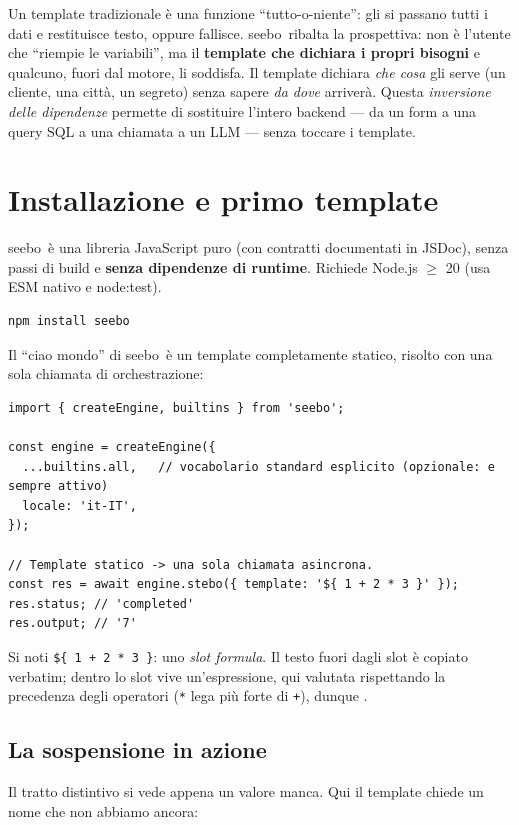 \documentclass[11pt,a4paper]{book}
\let\code\lstinline
\newcommand{\ic}[1]{{\ttfamily #1}}
\theoremstyle{definition}
\newcommand{\seebo}{\textsf{seebo}}
\begin{document}
Un template tradizionale è una funzione ``tutto-o-niente'': gli si passano tutti
i dati e restituisce testo, oppure fallisce. \seebo\ ribalta la prospettiva: non
è l'utente che ``riempie le variabili'', ma il \textbf{template che dichiara i
propri bisogni} e qualcuno, fuori dal motore, li soddisfa. Il template dichiara
\emph{che cosa} gli serve (un cliente, una città, un segreto) senza sapere
\emph{da dove} arriverà. Questa \emph{inversione delle dipendenze} permette di
sostituire l'intero backend --- da un form a una query SQL a una chiamata a un
LLM --- senza toccare i template.

\section{Installazione e primo template}

\seebo\ è una libreria JavaScript puro (con contratti documentati in JSDoc),
senza passi di build e \textbf{senza dipendenze di runtime}. Richiede Node.js
$\geq$ 20 (usa ESM nativo e \ic{node:test}).

\begin{lstlisting}
npm install seebo
\end{lstlisting}

Il ``ciao mondo'' di \seebo\ è un template completamente statico, risolto con una
sola chiamata di orchestrazione:

\begin{lstlisting}
import { createEngine, builtins } from 'seebo';

const engine = createEngine({
  ...builtins.all,   // vocabolario standard esplicito (opzionale: e sempre attivo)
  locale: 'it-IT',
});

// Template statico -> una sola chiamata asincrona.
const res = await engine.stebo({ template: '${ 1 + 2 * 3 }' });
res.status; // 'completed'
res.output; // '7'
\end{lstlisting}

Si noti \code|${ 1 + 2 * 3 }|: uno \emph{slot formula}. Il testo fuori dagli slot
è copiato verbatim; dentro lo slot vive un'espressione, qui valutata rispettando
la precedenza degli operatori (\code|*| lega più forte di \code|+|), dunque
\ic{7}.

\subsection{La sospensione in azione}

Il tratto distintivo si vede appena un valore manca. Qui il template chiede un
nome che non abbiamo ancora:
\end{document}
